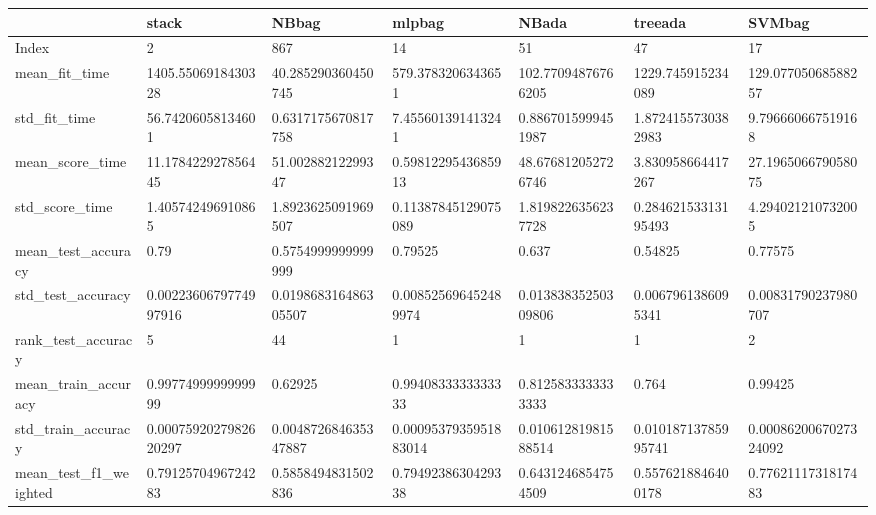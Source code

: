 \begin{tabular}{lllllll}
\toprule
{} &                   stack &                  NBbag &                 mlpbag &                  NBada &                treeada &                  SVMbag \\
\midrule
Index                       &                       2 &                    867 &                     14 &                     51 &                     47 &                      17 \\
mean\_fit\_time               &      1405.5506918430328 &     40.285290360450745 &      579.3783206343651 &     102.77094876766205 &      1229.745915234089 &      129.07705068588257 \\
std\_fit\_time                &       56.74206058134601 &     0.6317175670817758 &      7.455601391413241 &     0.8867015999451987 &     1.8724155730382983 &       9.796660667519168 \\
mean\_score\_time             &      11.178422927856445 &      51.00288212299347 &     0.5981229543685913 &     48.676812052726746 &      3.830958664417267 &      27.196506679058075 \\
std\_score\_time              &       1.405742496910865 &     1.8923625091969507 &    0.11387845129075089 &     1.8198226356237728 &    0.28462153313195493 &       4.294021210732005 \\
mean\_test\_accuracy          &                    0.79 &     0.5754999999999999 &                0.79525 &                  0.637 &                0.54825 &                 0.77575 \\
std\_test\_accuracy           &   0.0022360679774997916 &   0.019868316486305507 &   0.008525696452489974 &    0.01383835250309806 &     0.0067961386095341 &     0.00831790237980707 \\
rank\_test\_accuracy          &                       5 &                     44 &                      1 &                      1 &                      1 &                       2 \\
mean\_train\_accuracy         &      0.9977499999999999 &                0.62925 &     0.9940833333333333 &     0.8125833333333333 &                  0.764 &                 0.99425 \\
std\_train\_accuracy          &   0.0007592027982620297 &   0.004872684635347887 &  0.0009537935951883014 &    0.01061281981588514 &    0.01018713785995741 &   0.0008620067027324092 \\
mean\_test\_f1\_weighted       &      0.7912570496724283 &     0.5858494831502836 &     0.7949238630429338 &     0.6431246854754509 &     0.5576218846400178 &      0.7762111731817483 \\

\end{tabular}
